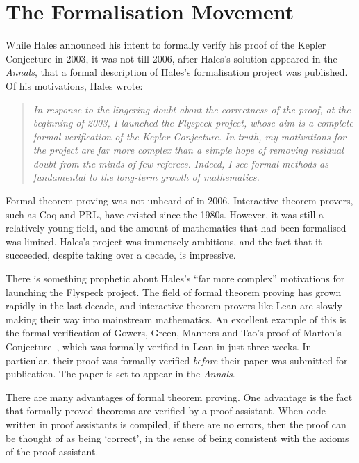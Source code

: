 \section{The Formalisation Movement}

While Hales announced his intent to formally verify his proof of the Kepler Conjecture in 2003, it was not till 2006, after Hales's solution appeared in the \textit{Annals}, that a formal description of Hales's formalisation project was published. Of his motivations, Hales wrote:
\begin{quote}
    \textit{In response to the lingering doubt about the correctness of the proof, at the beginning of 2003, I launched the \emph{Flyspeck} project, whose aim is a complete formal verification of the Kepler Conjecture. In truth, my motivations for the project are far more complex than a simple hope of removing residual doubt from the minds of few referees. Indeed, I see formal methods as fundamental to the long-term growth of mathematics.}~\cite{FlyspeckAnnouncement}
\end{quote}
Formal theorem proving was not unheard of in 2006. Interactive theorem provers, such as Coq and PRL, have existed since the 1980s. However, it was still a relatively young field, and the amount of mathematics that had been formalised was limited. Hales's project was immensely ambitious, and the fact that it succeeded, despite taking over a decade, is impressive.

There is something prophetic about Hales's ``far more complex'' motivations for launching the Flyspeck project. The field of formal theorem proving has grown rapidly in the last decade, and interactive theorem provers like Lean are slowly making their way into mainstream mathematics. An excellent example of this is the formal verification of Gowers, Green, Manners and Tao's proof of Marton's Conjecture~\cite{PFROriginalPaper}, which was formally verified in Lean in just three weeks. In particular, their proof was formally verified \textit{before} their paper was submitted for publication. The paper is set to appear in the \textit{Annals}.

There are many advantages of formal theorem proving. One advantage is the fact that formally proved theorems are verified by a proof assistant. When code written in proof assistants is compiled, if there are no errors, then the proof can be thought of as being `correct', in the sense of  being consistent with the axioms of the proof assistant.

